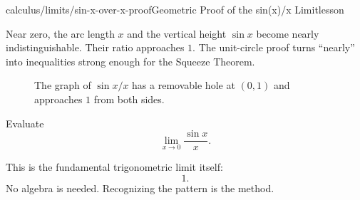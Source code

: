 \begin{webpage}{calculus/limits/sin-x-over-x-proof}{Geometric Proof of the sin(x)/x Limit}{lesson}
\begin{bgconcept}
Near zero, the arc length \(x\) and the vertical height \(\sin x\) become nearly indistinguishable. Their ratio approaches \(1\). The unit-circle proof turns ``nearly'' into inequalities strong enough for the Squeeze Theorem.
\end{bgconcept}

\begin{figure}[htbp]
\centering
{}
\caption{The graph of \(\sin x/x\) has a removable hole at \((0,1)\) and approaches \(1\) from both sides.}
\label{fig:sinc}
\end{figure}

\begin{bgguided}[title={Use the exact pattern}]
Evaluate
\[
  \lim_{x\to0}\frac{\sin x}{x}.
\]

\begin{bgsolution}
This is the fundamental trigonometric limit itself:
\[
  \boxed{1}.
\]
No algebra is needed. Recognizing the pattern is the method.
\end{bgsolution}
\end{bgguided}


\end{webpage}


